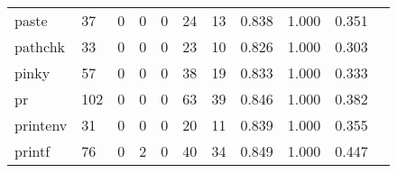 \begin{longtable}{lp{1.2cm}p{1.2cm}p{1.2cm}p{1.2cm}p{1.2cm}p{1.2cm}p{1.2cm}p{1.2cm}p{1.2cm}p{1.2cm}}
paste     &                                    37 &                                                  0 &                                                  0 &                                                  0 &                                                 24 &                                                 13 &                                         0.838 &                                              1.000 &                                              0.351 \\
pathchk   &                                    33 &                                                  0 &                                                  0 &                                                  0 &                                                 23 &                                                 10 &                                         0.826 &                                              1.000 &                                              0.303 \\
pinky     &                                    57 &                                                  0 &                                                  0 &                                                  0 &                                                 38 &                                                 19 &                                         0.833 &                                              1.000 &                                              0.333 \\
pr        &                                   102 &                                                  0 &                                                  0 &                                                  0 &                                                 63 &                                                 39 &                                         0.846 &                                              1.000 &                                              0.382 \\
printenv  &                                    31 &                                                  0 &                                                  0 &                                                  0 &                                                 20 &                                                 11 &                                         0.839 &                                              1.000 &                                              0.355 \\
printf    &                                    76 &                                                  0 &                                                  2 &                                                  0 &                                                 40 &                                                 34 &                                         0.849 &                                              1.000 &                                              0.447 \\

\end{longtable}
